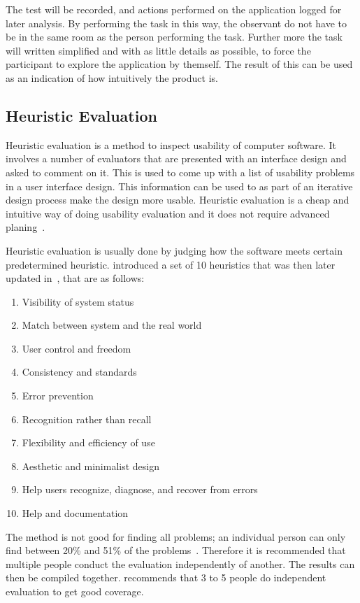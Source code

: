 The test will be recorded, and actions performed on the application logged for later analysis. By performing the task in this way, the observant do not have to be in the same room as the person performing the task. Further more the task will written simplified and with as little details as possible, to force the participant to explore the application by themself. The result of this can be used as an indication of how intuitively the product is.

\subsection{Heuristic Evaluation}
Heuristic evaluation is a method to inspect usability of computer software. It involves a number of evaluators that are presented with an interface design and asked to comment on it. This is used to come up with a list of usability problems in a user interface design. This information can be used to as part of an iterative design process make the design more usable. Heuristic evaluation is a cheap and intuitive way of doing usability evaluation and it does not require advanced planing~\cite{Nielsen1990}.

Heuristic evaluation is usually done by judging how the software meets certain predetermined heuristic. \cite{Nielsen1990} introduced a set of 10 heuristics that was then later updated in~\cite{Nielsen1994}, that are as follows:

\begin{enumerate}
  \item Visibility of system status
  \item Match between system and the real world
  \item User control and freedom
  \item Consistency and standards
  \item Error prevention
  \item Recognition rather than recall
  \item Flexibility and efficiency of use
  \item Aesthetic and minimalist design
  \item Help users recognize, diagnose, and recover from errors
  \item Help and documentation
\end{enumerate}

The method is not good for finding all problems; an individual person can only find between 20\% and 51\% of the problems~\cite{Nielsen1990}. Therefore it is recommended that multiple people conduct the evaluation independently of another. The results can then be compiled together. \cite{Nielsen1990} recommends that 3 to 5 people do independent evaluation to get good coverage.

